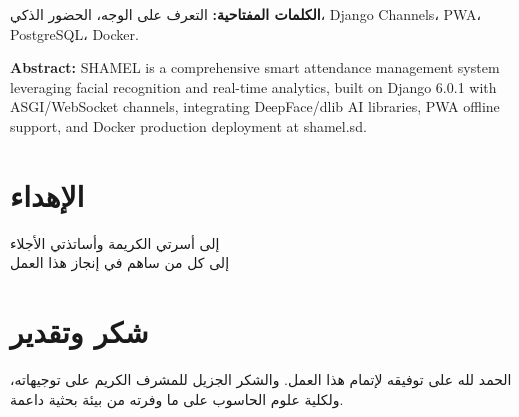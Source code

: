 \documentclass[12pt, a4paper]{report}
\begin{document}
\bigskip\noindent\textbf{الكلمات المفتاحية:} التعرف على الوجه، الحضور الذكي، Django Channels، PWA، PostgreSQL، Docker.

\bigskip\noindent\textbf{Abstract:} SHAMEL is a comprehensive smart attendance management system leveraging facial recognition and real-time analytics, built on Django 6.0.1 with ASGI/WebSocket channels, integrating DeepFace/dlib AI libraries, PWA offline support, and Docker production deployment at shamel.sd.

\chapter*{الإهداء}
\begin{center}\vspace*{2cm}
  {\Large إلى أسرتي الكريمة وأساتذتي الأجلاء}\\[0.5cm]
  {\large إلى كل من ساهم في إنجاز هذا العمل}
\end{center}

\chapter*{شكر وتقدير}
الحمد لله على توفيقه لإتمام هذا العمل. والشكر الجزيل للمشرف الكريم على توجيهاته، ولكلية علوم الحاسوب على ما وفرته من بيئة بحثية داعمة.

\tableofcontents
\listoffigures
\listoftables

\cleardoublepage
{}







\printbibliography[heading=bibintoc, title={المراجع والمصادر}]

\appendix

\end{document}

